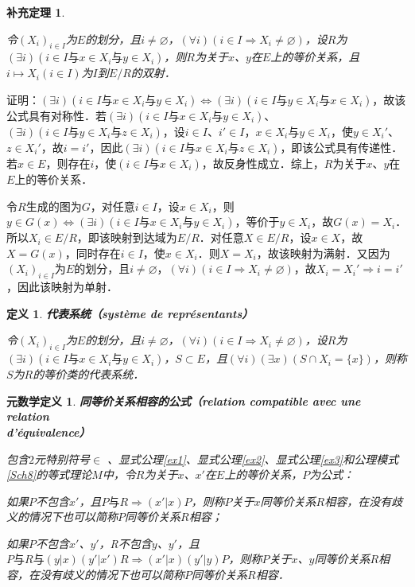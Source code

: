 \documentclass[12pt, a4paper, oneside]{book}
\newtheorem{metadef}{元数学定义}
\newtheorem{cor}{补充定理}
\newtheorem{de}{定义}
\begin{document}
			\begin{cor}\label{cor148}
				\hfill\par
				令$(X_i)_{i\in I}$为$E$的划分，且$i\neq \varnothing$，$(\forall i)(i\in I\Rightarrow X_i\neq \varnothing)$，设$R$为$(\exists i)(i\in I\text{与}x\in X_i\text{与}y\in X_i)$，则$R$为关于$x$、$y$在$E$上的等价关系，且$i\mapsto X_i(i\in I)$为$I$到$E/R$的双射．
			\end{cor}
			证明：$(\exists i)(i\in I\text{与}x\in X_i\text{与}y\in X_i)\Leftrightarrow (\exists i)(i\in I\text{与}y\in X_i\text{与}x\in X_i)$，故该公式具有对称性．若$(\exists i)(i\in I\text{与}x\in X_i\text{与}y\in X_i)$、$(\exists i)(i\in I\text{与}y\in X_i\text{与}z\in X_i)$，设$i\in I$、$i'\in I$，$x\in X_i\text{与}y\in X_i$，使$y\in X_i'$、$z\in X_i'$，故$i=i'$，因此$(\exists i)(i\in I\text{与}x\in X_i\text{与}z\in X_i)$，即该公式具有传递性．若$x\in E$，则存在$i$，使$(i\in I\text{与}x\in X_i)$，故反身性成立．综上，$R$为关于$x$、$y$在$E$上的等价关系．
			\par
			令$R$生成的图为$G$，对任意$i\in I$，设$x\in X_i$，则$y\in G(x)\Leftrightarrow (\exists i)(i\in I\text{与}x\in X_i\text{与}y\in X_i)$，等价于$y\in X_i$，故$G(x)=X_i$．所以$X_i\in E/R$，即该映射到达域为$E/R$．对任意$X\in E/R$，设$x\in X$，故$X=G(x)$，同时存在$i\in I$，使$x\in X_i$．则$X=X_i$，故该映射为满射．又因为$(X_i)_{i\in I}$为$E$的划分，且$i\neq \varnothing$，$(\forall i)(i\in I\Rightarrow X_i\neq \varnothing)$，故$X_i=X_i'\Rightarrow i=i'$，因此该映射为单射．
			
			\begin{de}
				\textbf{代表系统（système de représentants）}
				\par
				令$(X_i)_{i\in I}$为$E$的划分，且$i\neq \varnothing$，$(\forall i)(i\in I\Rightarrow X_i\neq \varnothing)$，设$R$为$(\exists i)(i\in I\text{与}x\in X_i\text{与}y\in X_i)$，$S\subset E$，且$(\forall i)(\exists x)(S\cap X_i=\{x\})$，则称$S$为$R$的等价类的代表系统．
			\end{de}

			\begin{metadef}
				\textbf{同等价关系相容的公式（relation compatible avec une relation \\d'équivalence）}
				\par
				包含$2$元特别符号$\in$ 、显式公理\ref{ex1}、显式公理\ref{ex2}、显式公理\ref{ex3}和公理模式\ref{Sch8}的等式理论$M$中，令$R$为关于$x$、$x'$在$E$上的等价关系，$P$为公式：
				\par
				如果$P$不包含$x'$，且$P\text{与}R\Rightarrow (x'|x)P$，则称$P$关于$x$同等价关系$R$相容，在没有歧义的情况下也可以简称$P$同等价关系$R$相容；
				\par
				如果$P$不包含$x'$、$y'$，R不包含$y$、$y'$，且$P\text{与}R\text{与}(y|x)(y'|x')R\Rightarrow (x'|x)(y'|y)P$，则称$P$关于$x$、$y$同等价关系$R$相容，在没有歧义的情况下也可以简称$P$同等价关系$R$相容．
			\end{metadef}	
\end{document}
